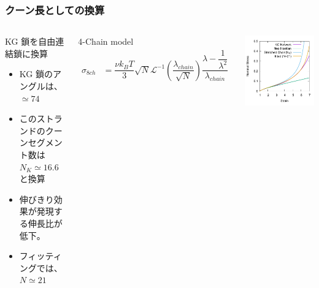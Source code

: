 \documentclass[11pt, dvipdfmx]{beamer}
\begin{document}
\begin{frame}
\frametitle{クーン長としての換算}

\begin{columns}[totalwidth=1\textwidth]
\small
\begin{alertblock}{KG 鎖を自由連結鎖に換算}
\begin{itemize}
\item
KG 鎖のアングルは、$\simeq74$
\item
このストランドのクーンセグメント数は $N_K\simeq16.6$ と換算
\item
伸びきり効果が発現する伸長比が低下。
\item
フィッティングでは、$N\simeq21$
\end{itemize}
\end{alertblock}

\footnotesize
4-Chain model
\tiny
\begin{align*}
\sigma_{8ch}
	&= \dfrac{\nu k_B T }{3}\sqrt{N}
			\mathcal{L}^{-1} \left(\dfrac{\lambda_{chain}}{ \sqrt{N} } \right)
			\dfrac{\lambda-\dfrac{1}{\lambda^2}}{\lambda_{chain}} 
\end{align*}

\centering
\includegraphics[width=\columnwidth]{./fig/SS_Kuhn.pdf}

\end{columns}
\end{frame}
\end{document}
